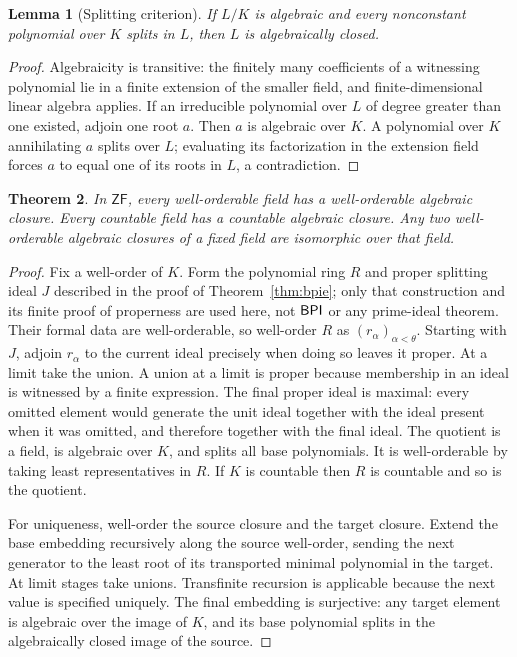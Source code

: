 \documentclass[11pt,a4paper]{article}
\newtheorem{theorem}{Theorem}[section]
\newtheorem{lemma}[theorem]{Lemma}
\theoremstyle{definition}\newtheorem{definition}[theorem]{Definition}
\theoremstyle{remark}\newtheorem{remark}[theorem]{Remark}
\newcommand{\ZF}{\mathsf{ZF}}\newcommand{\ZFA}{\mathsf{ZFA}}
\begin{document}
\begin{lemma}[Splitting criterion]\label{lem:splitting}
If $L/K$ is algebraic and every nonconstant polynomial over $K$ splits in $L$, then $L$ is algebraically closed.
\end{lemma}
\begin{proof}
Algebraicity is transitive: the finitely many coefficients of a witnessing polynomial lie in a finite extension of the smaller field, and finite-dimensional linear algebra applies. If an irreducible polynomial over $L$ of degree greater than one existed, adjoin one root $a$. Then $a$ is algebraic over $K$. A polynomial over $K$ annihilating $a$ splits over $L$; evaluating its factorization in the extension field forces $a$ to equal one of its roots in $L$, a contradiction.
\end{proof}

\begin{theorem}\label{thm:wo}
In $\ZF$, every well-orderable field has a well-orderable algebraic closure. Every countable field has a countable algebraic closure. Any two well-orderable algebraic closures of a fixed field are isomorphic over that field.
\end{theorem}
\begin{proof}
Fix a well-order of $K$. Form the polynomial ring $R$ and proper splitting ideal $J$ described in the proof of Theorem~\ref{thm:bpie}; only that construction and its finite proof of properness are used here, not $\mathsf{BPI}$ or any prime-ideal theorem. Their formal data are well-orderable, so well-order $R$ as $(r_\alpha)_{\alpha<\theta}$. Starting with $J$, adjoin $r_\alpha$ to the current ideal precisely when doing so leaves it proper. At a limit take the union. A union at a limit is proper because membership in an ideal is witnessed by a finite expression. The final proper ideal is maximal: every omitted element would generate the unit ideal together with the ideal present when it was omitted, and therefore together with the final ideal. The quotient is a field, is algebraic over $K$, and splits all base polynomials. It is well-orderable by taking least representatives in $R$. If $K$ is countable then $R$ is countable and so is the quotient.

For uniqueness, well-order the source closure and the target closure. Extend the base embedding recursively along the source well-order, sending the next generator to the least root of its transported minimal polynomial in the target. At limit stages take unions. Transfinite recursion is applicable because the next value is specified uniquely. The final embedding is surjective: any target element is algebraic over the image of $K$, and its base polynomial splits in the algebraically closed image of the source.
\end{proof}
\end{document}
